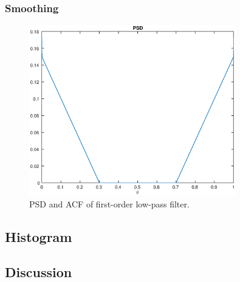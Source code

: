 \subsubsection{Smoothing}
\begin{figure}[h]
\centering
\includegraphics[width=0.8\textwidth]{bilder/Lab2/Lab2fig1.eps}
\caption{PSD and ACF of first-order low-pass filter.}
\label{fig:Lab1fig1}
\end{figure}


\subsection{Histogram}



\subsection{Discussion}
